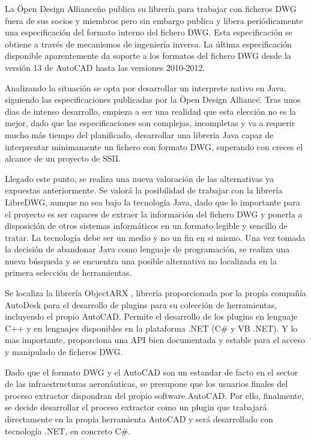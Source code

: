 La \"Open Design Alliance\" no publica su librería para trabajar con ficheros DWG fuera de sus socios y miembros pero sin embargo publica y libera periódicamente una especificación del formato interno del fichero DWG. Esta especificación se obtiene a través de mecanismos de ingeniería inversa. La última especificación disponible aparentemente da soporte a los formatos del fichero DWG desde la versión 13 de AutoCAD hasta las versiones 2010-2012. 

Analizando la situación se opta por desarrollar un interprete nativo en Java, siguiendo las especificaciones publicadas por la \"Open Design Alliance\". Tras unos dias de intenso desarrollo, empieza a ser una realidad que esta elección no es la mejor, dado que las especificaciones son complejas, incompletas y va a requerir mucho más tiempo del planificado, desarrollar una libreria Java capaz de interprentar minimamente un fichero con formato DWG, superando con creces el alcance de un proyecto de SSII.

Llegado este punto, se realiza una nueva valoración de las alternativas ya expuestas anteriormente. Se valorá la posibilidad de trabajar con la librería LibreDWG, aunque no sea bajo la tecnología Java, dado que lo importante para el proyecto es ser capaces de extraer la información del fichero DWG y ponerla a disposición de otros sistemas informáticos en un formato legible y sencillo de tratar. La tecnología debe ser un medio y no un fin en si mismo. Una vez tomada la decisión de abandonar Java como lenguaje de programación, se realiza una nueva búsqueda y se encuentra una posible alternativa no localizada en la primera selección de herramientas. 

Se localiza la librería ObjectARX \cite{ObjectARX}, librería proporcionada por la propía compañía AutoDesk para el desarrollo de plugins para su colección de herramientas, incluyendo el propio AutoCAD. Permite el desarrollo de los plugins en lenguaje C++ y en lenguajes disponibles en la plataforma .NET (C\# y VB .NET). Y lo mas importante, proporciona una API bien documentada y estable para el acceso y manipulado de ficheros DWG.

Dado que el formato DWG y el AutoCAD son un estandar de facto en el sector de las infraestructuras aeronáuticas, se presupone que los usuarios finales del proceso extractor dispondran del propio software AutoCAD. Por ello, finalmente, se decide desarrollar el proceso extractor como un plugin que trabajará directamente en la propia herramienta AutoCAD y será desarrollado con tecnología .NET, en concreto C\#. 

